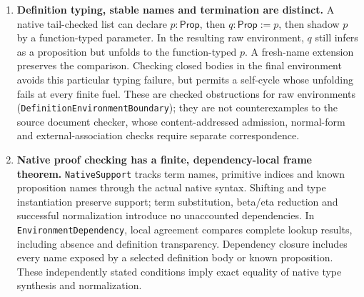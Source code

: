 \documentclass[11pt]{article}
\theoremstyle{definition}
\theoremstyle{remark}
\begin{document}
\begin{enumerate}
  The model condition is instantiated independently on this same native
  environment in \nolinkurl{NativeDefinitionModel}. The declared identity
  function denotes identity, while the meanings of $p$ and $q:=\mathsf{id}\,p$
  are independently chosen propositions. Exact erasure determines the checked
  bodies. The declaration equations hold exactly when the chosen propositions
  are equivalent; they imply meaning preservation for the actual two-level
  unfolding beneath the schematic binder. Assigning $p$ true and $q$ false
  preserves the native typing checks but refutes both those equations and
  unfolding preservation. This specimen uses a standard full model; the
  generic preservation theorem above also applies to non-full Henkin models.
\item \textbf{Definition typing, stable names and termination are distinct.}
  A native tail-checked list can declare $p:\mathsf{Prop}$, then
  $q:\mathsf{Prop}:=p$, then shadow $p$ by a function-typed parameter.
  In the resulting raw environment, $q$ still infers as a proposition but
  unfolds to the function-typed $p$. A fresh-name extension preserves the
  comparison. Checking closed bodies in the final environment avoids this
  particular typing failure, but permits a self-cycle whose unfolding fails
  at every finite fuel. These are checked obstructions for raw environments
  (\nolinkurl{DefinitionEnvironmentBoundary}); they are not counterexamples
  to the source document checker, whose content-addressed admission,
  normal-form and external-association checks require separate correspondence.
\item \textbf{Native proof checking has a finite, dependency-local frame theorem.}
  \nolinkurl{NativeSupport} tracks term names, primitive indices and known
  proposition names through the actual native syntax. Shifting and type
  instantiation preserve support; term substitution, beta/eta reduction and
  successful normalization introduce no unaccounted dependencies. In
  \nolinkurl{EnvironmentDependency}, local agreement compares complete lookup
  results, including absence and definition transparency. Dependency closure
  includes every name exposed by a selected definition body or known
  proposition. These independently stated conditions imply exact equality of
  native type synthesis and normalization.


\end{enumerate}
\end{document}
